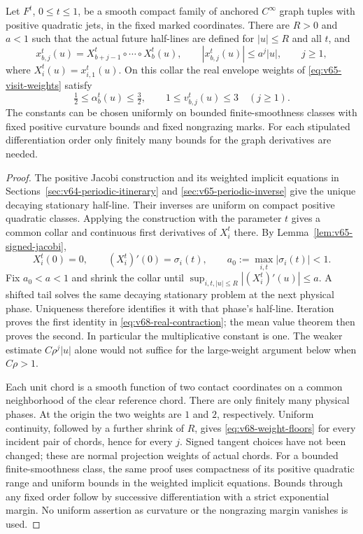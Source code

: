 \begin{lemma}\label{lem:v68-real-visits}
Let $F^t$, $0\le t\le1$, be a smooth compact family of anchored
$C^\infty$ graph tuples with positive quadratic jets, in the fixed
marked coordinates.  There are $R>0$ and $a<1$ such that the actual
future half-lines are defined for $|u|\le R$ and all $t$, and
\begin{equation}\label{eq:v68-real-contraction}
 x^t_{b,j}(u)=X^t_{b+j-1}\circ\cdots\circ X^t_b(u),\qquad
 |x^t_{b,j}(u)|\le a^j|u|,\qquad j\ge1,
\end{equation}
where $X^t_i(u)=x^t_{i,1}(u)$.  On this collar the real envelope
weights of \eqref{eq:v65-visit-weights} satisfy
\begin{equation}\label{eq:v68-weight-floors}
 \tfrac12\le\alpha_b^t(u)\le\tfrac32,\qquad
 1\le v_{b,j}^t(u)\le3\quad(j\ge1).
\end{equation}
The constants can be chosen uniformly on bounded finite-smoothness
classes with fixed positive curvature bounds and fixed nongrazing
marks.  For each stipulated differentiation order only finitely many
bounds for the graph derivatives are needed.
\end{lemma}
\begin{proof}
The positive Jacobi construction and its weighted implicit equations in
Sections~\ref{sec:v64-periodic-itinerary} and
\ref{sec:v65-periodic-inverse} give the unique decaying stationary
half-line.  Their inverses are uniform on compact positive quadratic
classes.  Applying the construction with the parameter $t$ gives a
common collar and continuous first derivatives of $X_i^t$ there.
By Lemma~\ref{lem:v65-signed-jacobi},
\[
 X_i^t(0)=0,\qquad (X_i^t)'(0)=\sigma_i(t),\qquad
 a_0:=\max_{i,t}|\sigma_i(t)|<1.
\]
Fix $a_0<a<1$ and shrink the collar until
$\sup_{i,t,|u|\le R}|(X_i^t)'(u)|\le a$.  A shifted tail solves
the same decaying stationary problem at the next physical phase.
Uniqueness therefore identifies it with that phase's half-line.
Iteration proves the first identity in
\eqref{eq:v68-real-contraction}; the mean value theorem then proves
the second.  In particular the multiplicative constant is one.
The weaker estimate $C\rho^j|u|$ alone would not suffice for the
large-weight argument below when $C\rho>1$.

Each unit chord is a smooth function of two contact coordinates on a
common neighborhood of the clear reference chord.  There are only
finitely many physical phases.  At the origin the two weights are
$1$ and $2$, respectively.  Uniform continuity, followed by a further
shrink of $R$, gives \eqref{eq:v68-weight-floors} for every incident
pair of chords, hence for every $j$.  Signed tangent choices have not
been changed; these are normal projection weights of actual chords.
For a bounded finite-smoothness class, the same proof uses compactness
of its positive quadratic range and uniform bounds in the weighted
implicit equations.  Bounds through any fixed order follow by
successive differentiation with a strict exponential margin.  No
uniform assertion as curvature or the nongrazing margin vanishes is
used.
\end{proof}


